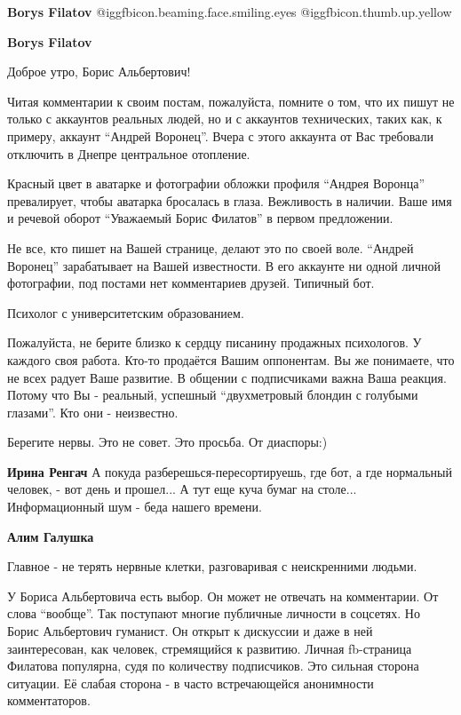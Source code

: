 \begin{itemize}
\begin{itemize}
\textbf{Borys Filatov}  @igg{fbicon.beaming.face.smiling.eyes}  @igg{fbicon.thumb.up.yellow} 

\textbf{Borys Filatov} 

Доброе утро, Борис Альбертович!

Читая комментарии к своим постам, пожалуйста, помните о том, что их пишут не
только с аккаунтов реальных людей, но и с аккаунтов технических, таких как, к
примеру, аккаунт \enquote{Андрей Воронец}. Вчера с этого аккаунта от Вас требовали
отключить в Днепре центральное отопление.

Красный цвет в аватарке и фотографии обложки профиля \enquote{Андрея Воронца}
превалирует, чтобы аватарка бросалась в глаза. Вежливость в наличии. Ваше имя и
речевой оборот \enquote{Уважаемый Борис Филатов} в первом предложении.

Не все, кто пишет на Вашей странице, делают это по своей воле. \enquote{Андрей Воронец}
зарабатывает на Вашей известности. В его аккаунте ни одной личной фотографии,
под постами нет комментариев друзей. Типичный бот.

Психолог с университетским образованием.

Пожалуйста, не берите близко к сердцу писанину продажных психологов. У каждого
своя работа. Кто-то продаётся Вашим оппонентам. Вы же понимаете, что не всех
радует Ваше развитие. В общении с подписчиками важна Ваша реакция. Потому что
Вы - реальный, успешный \enquote{двухметровый блондин с голубыми глазами}. Кто они -
неизвестно.

Берегите нервы.
Это не совет.
Это просьба.
От диаспоры:)

\textbf{Ирина Ренгач} А покуда разберешься-пересортируешь, где бот, а где нормальный человек, - вот день и прошел... А тут еще куча бумаг на столе... Информационный шум - беда нашего времени.

\textbf{Алим Галушка} 

Главное - не терять нервные клетки, разговаривая с неискренними людьми.

У Бориса Альбертовича есть выбор. Он может не отвечать на комментарии. От слова
\enquote{вообще}. Так поступают многие публичные личности в соцсетях. Но Борис
Альбертович гуманист. Он открыт к дискуссии и даже в ней заинтересован, как
человек, стремящийся к развитию. Личная fb-страница Филатова популярна, судя по
количеству подписчиков. Это сильная сторона ситуации. Её слабая сторона - в
часто встречающейся анонимности комментаторов.


\end{itemize}
\end{itemize}
